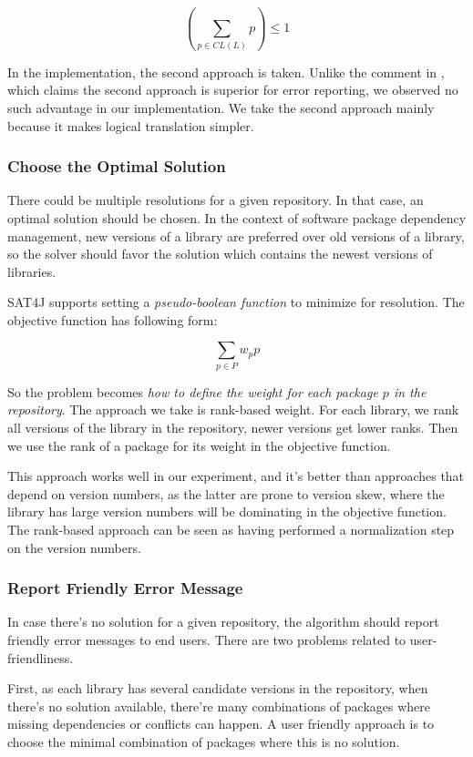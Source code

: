 \[
(\sum_{p \in CL(L)} p) \leq 1
\]

In the implementation, the second approach is taken. Unlike the comment in \cite{berre2009dependency}, which claims the second approach is superior for error reporting, we observed no such advantage in our implementation. We take the second approach mainly because it makes logical translation simpler.

\subsubsection{Choose the Optimal Solution}

There could be multiple resolutions for a given repository. In that case, an optimal solution should be chosen. In the context of software package dependency management, new versions of a library are preferred over old versions of a library, so the solver should favor the solution which contains the newest versions of libraries.

SAT4J supports setting a \emph{pseudo-boolean function} to minimize for resolution. The objective function has following form:

\[
\sum_{p \in P} w_p p
\]

So the problem becomes \emph{how to define the weight for each package $p$ in the repository}. The approach we take is rank-based weight. For each library, we rank all versions of the library in the repository, newer versions get lower ranks. Then we use the rank of a package for its weight in the objective function.

This approach works well in our experiment, and it's better than approaches that depend on version numbers, as the latter are prone to version skew, where the library has large version numbers will be dominating in the objective function. The rank-based approach can be seen as having performed a normalization step on the version numbers.

\subsubsection{Report Friendly Error Message}

In case there's no solution for a given repository, the algorithm should report friendly error messages to end users. There are two problems related to user-friendliness.

First, as each library has several candidate versions in the repository, when there's no solution available, there're many combinations of packages where missing dependencies or conflicts can happen. A user friendly approach is to choose the minimal combination of packages where this is no solution.

